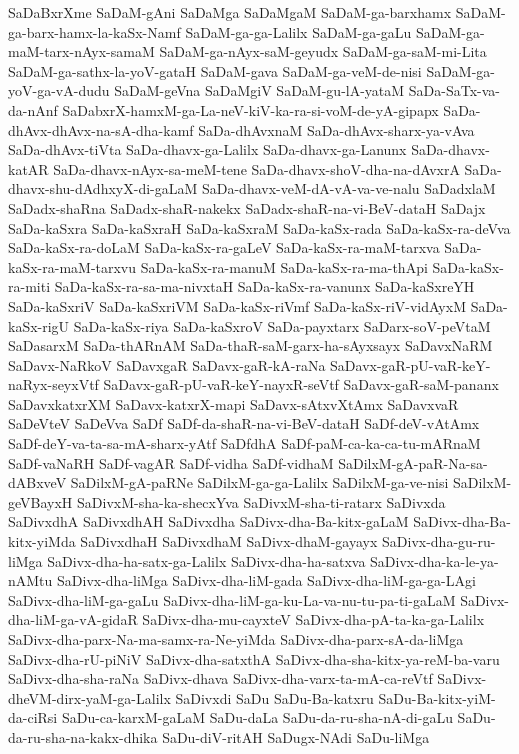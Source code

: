 {SaDaBxrXme
SaDaM-gAni
SaDaMga
SaDaMgaM
SaDaM-ga-barxhamx
SaDaM-ga-barx-hamx-la-kaSx-Namf
SaDaM-ga-ga-Lalilx
SaDaM-ga-gaLu
SaDaM-ga-maM-tarx-nAyx-samaM
SaDaM-ga-nAyx-saM-geyudx
SaDaM-ga-saM-mi-Lita
SaDaM-ga-sathx-la-yoV-gataH
SaDaM-gava
SaDaM-ga-veM-de-nisi
SaDaM-ga-yoV-ga-vA-dudu
SaDaM-geVna
SaDaMgiV
SaDaM-gu-lA-yataM
SaDa-SaTx-va-da-nAnf
SaDabxrX-hamxM-ga-La-neV-kiV-ka-ra-si-voM-de-yA-gipapx
SaDa-dhAvx-dhAvx-na-sA-dha-kamf
SaDa-dhAvxnaM
SaDa-dhAvx-sharx-ya-vAva
SaDa-dhAvx-tiVta
SaDa-dhavx-ga-Lalilx
SaDa-dhavx-ga-Lanunx
SaDa-dhavx-katAR
SaDa-dhavx-nAyx-sa-meM-tene
SaDa-dhavx-shoV-dha-na-dAvxrA
SaDa-dhavx-shu-dAdhxyX-di-gaLaM
SaDa-dhavx-veM-dA-vA-va-ve-nalu
SaDadxlaM
SaDadx-shaRna
SaDadx-shaR-nakekx
SaDadx-shaR-na-vi-BeV-dataH
SaDajx
SaDa-kaSxra
SaDa-kaSxraH
SaDa-kaSxraM
SaDa-kaSx-rada
SaDa-kaSx-ra-deVva
SaDa-kaSx-ra-doLaM
SaDa-kaSx-ra-gaLeV
SaDa-kaSx-ra-maM-tarxva
SaDa-kaSx-ra-maM-tarxvu
SaDa-kaSx-ra-manuM
SaDa-kaSx-ra-ma-thApi
SaDa-kaSx-ra-miti
SaDa-kaSx-ra-sa-ma-nivxtaH
SaDa-kaSx-ra-vanunx
SaDa-kaSxreYH
SaDa-kaSxriV
SaDa-kaSxriVM
SaDa-kaSx-riVmf
SaDa-kaSx-riV-vidAyxM
SaDa-kaSx-rigU
SaDa-kaSx-riya
SaDa-kaSxroV
SaDa-payxtarx
SaDarx-soV-peVtaM
SaDasarxM
SaDa-thARnAM
SaDa-thaR-saM-garx-ha-sAyxsayx
SaDavxNaRM
SaDavx-NaRkoV
SaDavxgaR
SaDavx-gaR-kA-raNa
SaDavx-gaR-pU-vaR-keY-naRyx-seyxVtf
SaDavx-gaR-pU-vaR-keY-nayxR-seVtf
SaDavx-gaR-saM-pananx
SaDavxkatxrXM
SaDavx-katxrX-mapi
SaDavx-sAtxvXtAmx
SaDavxvaR
SaDeVteV
SaDeVva
SaDf
SaDf-da-shaR-na-vi-BeV-dataH
SaDf-deV-vAtAmx
SaDf-deY-va-ta-sa-mA-sharx-yAtf
SaDfdhA
SaDf-paM-ca-ka-ca-tu-mARnaM
SaDf-vaNaRH
SaDf-vagAR
SaDf-vidha
SaDf-vidhaM
SaDilxM-gA-paR-Na-sa-dABxveV
SaDilxM-gA-paRNe
SaDilxM-ga-ga-Lalilx
SaDilxM-ga-ve-nisi
SaDilxM-geVBayxH
SaDivxM-sha-ka-shecxYva
SaDivxM-sha-ti-ratarx
SaDivxda
SaDivxdhA
SaDivxdhAH
SaDivxdha
SaDivx-dha-Ba-kitx-gaLaM
SaDivx-dha-Ba-kitx-yiMda
SaDivxdhaH
SaDivxdhaM
SaDivx-dhaM-gayayx
SaDivx-dha-gu-ru-liMga
SaDivx-dha-ha-satx-ga-Lalilx
SaDivx-dha-ha-satxva
SaDivx-dha-ka-le-ya-nAMtu
SaDivx-dha-liMga
SaDivx-dha-liM-gada
SaDivx-dha-liM-ga-ga-LAgi
SaDivx-dha-liM-ga-gaLu
SaDivx-dha-liM-ga-ku-La-va-nu-tu-pa-ti-gaLaM
SaDivx-dha-liM-ga-vA-gidaR
SaDivx-dha-mu-cayxteV
SaDivx-dha-pA-ta-ka-ga-Lalilx
SaDivx-dha-parx-Na-ma-samx-ra-Ne-yiMda
SaDivx-dha-parx-sA-da-liMga
SaDivx-dha-rU-piNiV
SaDivx-dha-satxthA
SaDivx-dha-sha-kitx-ya-reM-ba-varu
SaDivx-dha-sha-raNa
SaDivx-dhava
SaDivx-dha-varx-ta-mA-ca-reVtf
SaDivx-dheVM-dirx-yaM-ga-Lalilx
SaDivxdi
SaDu
SaDu-Ba-katxru
SaDu-Ba-kitx-yiM-da-ciRsi
SaDu-ca-karxM-gaLaM
SaDu-daLa
SaDu-da-ru-sha-nA-di-gaLu
SaDu-da-ru-sha-na-kakx-dhika
SaDu-diV-ritAH
SaDugx-NAdi
SaDu-liMga
}
